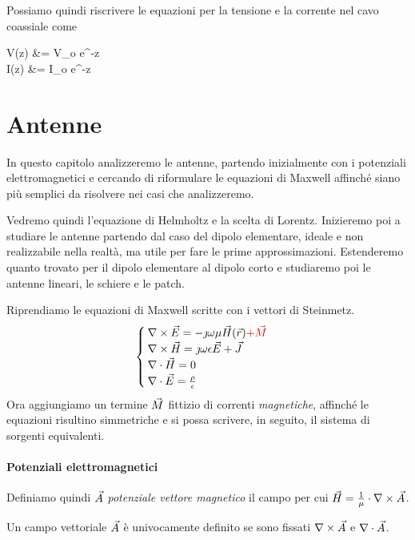 Possiamo quindi riscrivere le equazioni per la tensione e la corrente nel cavo coassiale come
\begin{esp}
	V(z) &= V_o \cdot e^{-\jmath \beta \cdot z}\\
	I(z) &= I_o \cdot e^{-\jmath \beta \cdot z}
\end{esp}

\chapter{Antenne}
In questo capitolo analizzeremo le antenne, partendo inizialmente con i potenziali elettromagnetici e cercando di riformulare le equazioni di Maxwell affinché siano più semplici da risolvere nei casi che analizzeremo.

Vedremo quindi l'equazione di Helmholtz e la scelta di Lorentz. Inizieremo poi a studiare le antenne partendo dal caso del dipolo elementare, ideale e non realizzabile nella realtà, ma utile per fare le prime approssimazioni. Estenderemo quanto trovato per il dipolo elementare al dipolo corto e studiaremo poi le antenne lineari, le schiere e le patch.

Riprendiamo le equazioni di Maxwell scritte con i vettori di Steinmetz.
\begin{equation}\label{eq:maxw-ant}\begin{cases}
	\rot\E = -\jmath \omega \mu\H(\r) \textcolor[rgb]{0.8,0,0}{+ \M} \\
	\rot\H = \jmath \omega \epsilon \E + \J\\
	\diverg\H=0\\
	\diverg \E = \frac{\rho}{\epsilon}
\end{cases}\end{equation}
Ora aggiungiamo un termine $\vec{M}$ fittizio di correnti \emph{magnetiche}, affinché le equazioni risultino simmetriche e si possa scrivere, in seguito, il sistema di sorgenti equivalenti.

\subsubsection{Potenziali elettromagnetici}
Definiamo quindi $\vec{A}$ \emph{potenziale vettore magnetico} il campo per cui $\vec{H} = \frac{1}{\mu} \cdot \nabla\times \vec{A}$.

\begin{theorem}
	Un campo vettoriale $\vec{A}$ è univocamente definito se sono fissati $\nabla\times \vec{A}$ e $\nabla\cdot \vec{A}$.
\end{theorem}

